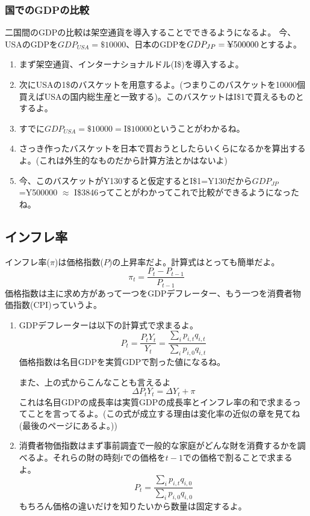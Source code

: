 \documentclass[a4paper, 12pt]{article}
\begin{document}
\subsubsection{国でのGDPの比較}
二国間のGDPの比較は架空通貨を導入することでできるようになるよ。
今、USAのGDPを$GDP_{USA}=\$10000$、日本のGDPを$GDP_{JP}=\text{Y\llap{=}}500000$とするよ。
\begin{enumerate}
  \item まず架空通貨、インターナショナルドル(I\$)を導入するよ。
  \item 次にUSAの1\$のバスケットを用意するよ。(つまりこのバスケットを10000個買えばUSAの国内総生産と一致する)。このバスケットはI\$1で買えるものとするよ。
  \item すでに$GDP_{USA}=\$10000=\text{I\$}10000$ということがわかるね。
  \item さっき作ったバスケットを日本で買おうとしたらいくらになるかを算出するよ。(これは外生的なものだから計算方法とかはないよ)
  \item 今、このバスケットがY\llap{=}130すると仮定するとI\$1=Y\llap{=}130だから$GDP_{JP}$=Y\llap{=}500000 $\approx$ I\$3846ってことがわかってこれで比較ができるようになったね。
\end{enumerate}

\newpage

\subsection{インフレ率}
インフレ率($\pi$)は価格指数($P$)の上昇率だよ。計算式はとっても簡単だよ。
\begin{equation*}
  \pi_t=\frac{P_t-P_{t-1}}{P_{t-1}}
\end{equation*}
価格指数は主に求め方があって一つをGDPデフレーター、もう一つを消費者物価指数(CPI)っていうよ。
\begin{enumerate}
  \item GDPデフレーターは以下の計算式で求まるよ。
  \begin{equation*}
    P_t=\frac{P_tY_t}{Y_t}=\frac{\sum_i p_{i,t}q_{i,t}}{\sum_i p_{i,0}q_{i,t}}
  \end{equation*}
  価格指数は名目GDPを実質GDPで割った値になるね。

  また、上の式からこんなことも言えるよ
  \begin{equation*}
    \Delta P_tY_t = \Delta Y_t + \pi
  \end{equation*}
  これは名目GDPの成長率は実質GDPの成長率とインフレ率の和で求まるってことを言ってるよ。(この式が成立する理由は変化率の近似の章を見てね(最後のページにあるよ。))
  \item 消費者物価指数はまず事前調査で一般的な家庭がどんな財を消費するかを調べるよ。それらの財の時刻$t$での価格を$t-1$での価格で割ることで求まるよ。
  \begin{equation*}
    P_t=\frac{\sum_i p_{i,t}q_{i,0}}{\sum_i p_{i,0}q_{i,0}}
  \end{equation*}
  もちろん価格の違いだけを知りたいから数量は固定するよ。
\end{enumerate}
\end{document}
